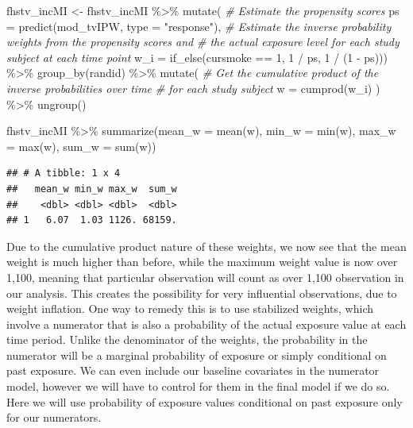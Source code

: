 \documentclass[
]{book}
\newenvironment{Shaded}{\begin{snugshade}}{\end{snugshade}}
\newcommand{\AttributeTok}[1]{\textcolor[rgb]{0.77,0.63,0.00}{#1}}
\newcommand{\CommentTok}[1]{\textcolor[rgb]{0.56,0.35,0.01}{\textit{#1}}}
\newcommand{\DecValTok}[1]{\textcolor[rgb]{0.00,0.00,0.81}{#1}}
\newcommand{\FunctionTok}[1]{\textcolor[rgb]{0.00,0.00,0.00}{#1}}
\newcommand{\NormalTok}[1]{#1}
\newcommand{\OtherTok}[1]{\textcolor[rgb]{0.56,0.35,0.01}{#1}}
\newcommand{\SpecialCharTok}[1]{\textcolor[rgb]{0.00,0.00,0.00}{#1}}
\newcommand{\StringTok}[1]{\textcolor[rgb]{0.31,0.60,0.02}{#1}}
\begin{document}
\begin{Shaded}
\begin{Highlighting}[]
\NormalTok{fhstv\_incMI }\OtherTok{\textless{}{-}}\NormalTok{ fhstv\_incMI }\SpecialCharTok{\%\textgreater{}\%}
  \FunctionTok{mutate}\NormalTok{(}
    \CommentTok{\# Estimate the propensity scores}
    \AttributeTok{ps =} \FunctionTok{predict}\NormalTok{(mod\_tvIPW, }\AttributeTok{type =} \StringTok{"response"}\NormalTok{), }
    \CommentTok{\# Estimate the inverse probability weights from the propensity scores and}
    \CommentTok{\# the actual exposure level for each study subject at each time point}
    \AttributeTok{w\_i =} \FunctionTok{if\_else}\NormalTok{(cursmoke }\SpecialCharTok{==} \DecValTok{1}\NormalTok{, }\DecValTok{1} \SpecialCharTok{/}\NormalTok{ ps, }\DecValTok{1} \SpecialCharTok{/}\NormalTok{ (}\DecValTok{1} \SpecialCharTok{{-}}\NormalTok{ ps))) }\SpecialCharTok{\%\textgreater{}\%} 
  \FunctionTok{group\_by}\NormalTok{(randid) }\SpecialCharTok{\%\textgreater{}\%}
  \FunctionTok{mutate}\NormalTok{(}
    \CommentTok{\# Get the cumulative product of the inverse probabilities over time}
    \CommentTok{\# for each study subject}
    \AttributeTok{w =} \FunctionTok{cumprod}\NormalTok{(w\_i)}
\NormalTok{  ) }\SpecialCharTok{\%\textgreater{}\%} 
  \FunctionTok{ungroup}\NormalTok{()}

\NormalTok{fhstv\_incMI }\SpecialCharTok{\%\textgreater{}\%}
  \FunctionTok{summarize}\NormalTok{(}\AttributeTok{mean\_w =} \FunctionTok{mean}\NormalTok{(w),}
            \AttributeTok{min\_w =} \FunctionTok{min}\NormalTok{(w),}
            \AttributeTok{max\_w =} \FunctionTok{max}\NormalTok{(w),}
            \AttributeTok{sum\_w =} \FunctionTok{sum}\NormalTok{(w))}
\end{Highlighting}
\end{Shaded}

\begin{verbatim}
## # A tibble: 1 x 4
##   mean_w min_w max_w  sum_w
##    <dbl> <dbl> <dbl>  <dbl>
## 1   6.07  1.03 1126. 68159.
\end{verbatim}

Due to the cumulative product nature of these weights, we now see that the mean weight is much higher than before, while the maximum weight value is now over 1,100, meaning that particular observation will count as over 1,100 observation in our analysis. This creates the possibility for very influential observations, due to weight inflation. One way to remedy this is to use stabilized weights, which involve a numerator that is also a probability of the actual exposure value at each time period. Unlike the denominator of the weights, the probability in the numerator will be a marginal probability of exposure or simply conditional on past exposure. We can even include our baseline covariates in the numerator model, however we will have to control for them in the final model if we do so. Here we will use probability of exposure values conditional on past exposure only for our numerators.
\end{document}

